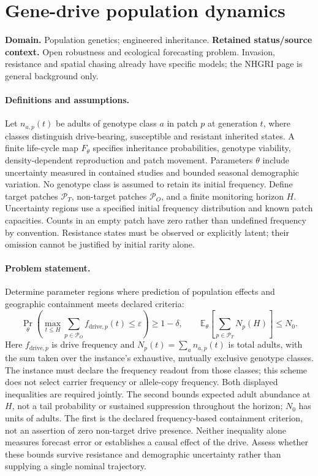 \documentclass[11pt]{article}
\begin{document}
\section*{Gene-drive population dynamics}
\label{prob:174}
\label{rank:163}
\par\smallskip

\noindent\textbf{Domain.} Population genetics; engineered inheritance. \quad \textbf{Retained status/source context.} Open robustness and ecological forecasting problem. Invasion, resistance and spatial chasing already have specific models; the NHGRI page is general background only.
\paragraph{Definitions and assumptions.} Let $n_{a,p}(t)$ be adults of genotype class $a$ in patch $p$ at generation $t$, where classes distinguish drive-bearing, susceptible and resistant inherited states. A finite life-cycle map $F_\theta$ specifies inheritance probabilities, genotype viability, density-dependent reproduction and patch movement. Parameters $\theta$ include uncertainty measured in contained studies and bounded seasonal demographic variation. No genotype class is assumed to retain its initial frequency. Define target patches $\mathcal P_T$, non-target patches $\mathcal P_O$, and a finite monitoring horizon $H$. Uncertainty regions use a specified initial frequency distribution and known patch capacities. Counts in an empty patch have zero rather than undefined frequency by convention. Resistance states must be observed or explicitly latent; their omission cannot be justified by initial rarity alone.
\paragraph{Problem statement.} Determine parameter regions where prediction of population effects and geographic containment meets declared criteria:
\[
 \Pr_\theta\!\left(\max_{t\le H}\sum_{p\in\mathcal P_O}
 f_{\mathrm{drive},p}(t)\le\varepsilon\right)\ge1-\delta,
 \qquad
 \mathbb{E}_\theta\!\left[\sum_{p\in\mathcal P_T}N_p(H)\right]\le N_0.
\]
Here $f_{\mathrm{drive},p}$ is drive frequency and $N_p(t)=\sum_a n_{a,p}(t)$ is total adults, with the sum taken over the instance's exhaustive, mutually exclusive genotype classes. The instance must declare the frequency readout from those classes; this scheme does not select carrier frequency or allele-copy frequency. Both displayed inequalities are required jointly. The second bounds expected adult abundance at $H$, not a tail probability or sustained suppression throughout the horizon; $N_0$ has units of adults. The first is the declared frequency-based containment criterion, not an assertion of zero non-target drive presence. Neither inequality alone measures forecast error or establishes a causal effect of the drive. Assess whether these bounds survive resistance and demographic uncertainty rather than supplying a single nominal trajectory.
\end{document}
